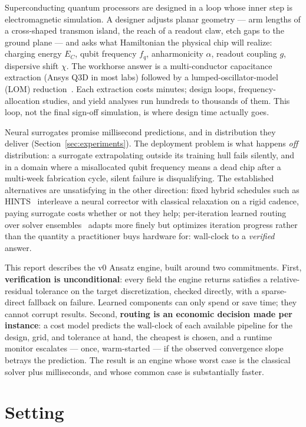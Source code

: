 \documentclass[11pt]{article}
\begin{document}
Superconducting quantum processors are designed in a loop whose inner step is
electromagnetic simulation. A designer adjusts planar geometry --- arm lengths
of a cross-shaped transmon island, the reach of a readout claw, etch gaps to
the ground plane --- and asks what Hamiltonian the physical chip will realize:
charging energy $E_C$, qubit frequency $f_q$, anharmonicity $\alpha$, readout
coupling $g$, dispersive shift $\chi$. The workhorse answer is a
multi-conductor capacitance extraction (Ansys Q3D in most labs) followed by a
lumped-oscillator-model (LOM) reduction~\cite{koch,minev}. Each extraction
costs minutes; design loops, frequency-allocation studies, and yield analyses
run hundreds to thousands of them. This loop, not the final sign-off
simulation, is where design time actually goes.

Neural surrogates promise millisecond predictions, and in distribution they
deliver (Section~\ref{sec:experiments}). The deployment problem is what
happens \emph{off} distribution: a surrogate extrapolating outside its
training hull fails silently, and in a domain where a misallocated qubit
frequency means a dead chip after a multi-week fabrication cycle, silent
failure is disqualifying. The established alternatives are unsatisfying in the
other direction: fixed hybrid schedules such as HINTS~\cite{hints} interleave
a neural corrector with classical relaxation on a rigid cadence, paying
surrogate costs whether or not they help; per-iteration learned routing over
solver ensembles~\cite{router} adapts more finely but optimizes iteration
progress rather than the quantity a practitioner buys hardware for:
wall-clock to a \emph{verified} answer.

This report describes the v0 Ansatz engine, built around two commitments.
First, \textbf{verification is unconditional}: every field the engine returns
satisfies a relative-residual tolerance on the target discretization, checked
directly, with a sparse-direct fallback on failure. Learned components can
only spend or save time; they cannot corrupt results. Second, \textbf{routing
is an economic decision made per instance}: a cost model predicts the
wall-clock of each available pipeline for the design, grid, and tolerance at
hand, the cheapest is chosen, and a runtime monitor escalates --- once,
warm-started --- if the observed convergence slope betrays the prediction.
The result is an engine whose worst case is the classical solver plus
milliseconds, and whose common case is substantially faster.

\section{Setting}
\label{sec:setting}
\end{document}
